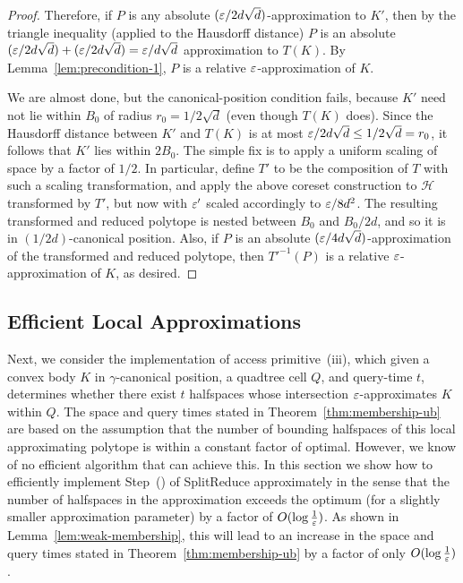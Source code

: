 \documentclass[11pt]{article}   \usepackage[letterpaper,hmargin=2.1cm,vmargin=3cm]{geometry}
\newcommand{\inv}[1]{\frac{1}{#1}}
\newcommand{\alg}{\textrm{SplitReduce}}
\begin{document}
\begin{proof}
Therefore, if $P$ is any absolute $(\varepsilon/2 d \sqrt{d})$-approximation to $K'$, then by the triangle inequality (applied to the Hausdorff distance) $P$ is an absolute $(\varepsilon/2 d \sqrt{d}) + (\varepsilon/2 d \sqrt{d}) = \varepsilon/d \sqrt{d}$ approximation to $T(K)$. By Lemma~\ref{lem:precondition-1}, $P$ is a relative $\varepsilon$-approximation of $K$.

We are almost done, but the canonical-position condition fails, because $K'$ need not lie within $B_0$ of radius $r_0 = 1/2 \sqrt{d}$ (even though $T(K)$ does). Since the Hausdorff distance between $K'$ and $T(K)$ is at most $\varepsilon/2 d \sqrt{d} \le 1/2\sqrt{d} = r_0$, it follows that $K'$ lies within $2 B_0$. The simple fix is to apply a uniform scaling of space by a factor of $1/2$. In particular, define $T'$ to be the composition of $T$ with such a scaling transformation, and apply the above coreset construction to $\mathcal{H}$ transformed by $T'$, but now with $\varepsilon'$ scaled accordingly to $\varepsilon/8 d^2$. The resulting transformed and reduced polytope is nested between $B_0$ and $B_0/2 d$, and so it is in $(1/2 d)$-canonical position. Also, if $P$ is an absolute $(\varepsilon/4 d \sqrt{d})$-approximation of the transformed and reduced polytope, then ${T'}^{-1}(P)$ is a relative $\varepsilon$-approximation of $K$, as desired.
\end{proof}


\subsection{Efficient Local Approximations} \label{sec:apx-cover}


Next, we consider the implementation of access primitive~(iii), which given a convex body $K$ in $\gamma$-canonical position, a quadtree cell $Q$, and query-time $t$, determines whether there exist $t$ halfspaces whose intersection $\varepsilon$-approximates $K$ within $Q$. The space and query times stated in Theorem~\ref{thm:membership-ub} are based on the assumption that the number of bounding halfspaces of this local approximating polytope is within a constant factor of optimal. However, we know of no efficient algorithm that can achieve this. In this section we show how to efficiently implement Step~(\stepapx) of {\alg} approximately in the sense that the number of halfspaces in the approximation exceeds the optimum (for a slightly smaller approximation parameter) by a factor of $O(\log \inv{\eps} )$. As shown in Lemma~\ref{lem:weak-membership}, this will lead to an increase in the space and query times stated in Theorem~\ref{thm:membership-ub} by a factor of only $O(\log \inv{\eps})$.
\end{document}
